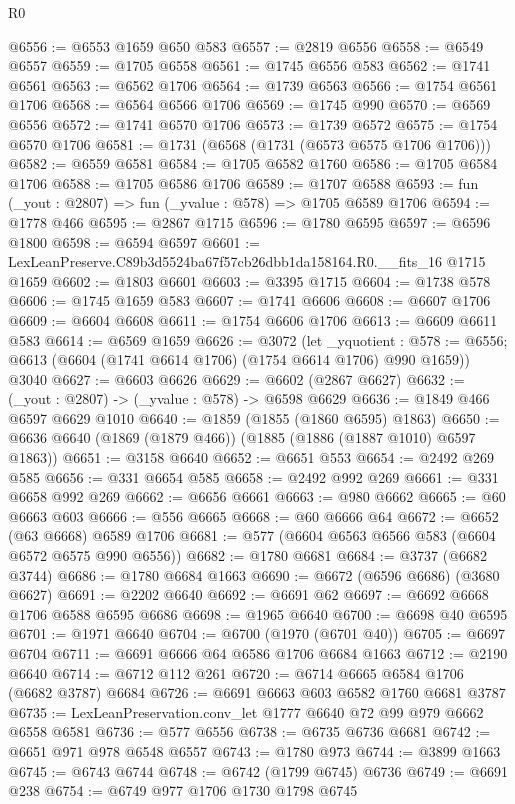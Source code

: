 \begin{lexlean}{R0}
\begin{coremodule}
@6556 := @6553 @1659 @650 @583
@6557 := @2819 @6556
@6558 := @6549 @6557
@6559 := @1705 @6558
@6561 := @1745 @6556 @583
@6562 := @1741 @6561
@6563 := @6562 @1706
@6564 := @1739 @6563
@6566 := @1754 @6561 @1706
@6568 := @6564 @6566 @1706
@6569 := @1745 @990
@6570 := @6569 @6556
@6572 := @1741 @6570 @1706
@6573 := @1739 @6572
@6575 := @1754 @6570 @1706
@6581 := @1731 (@6568 (@1731 (@6573 @6575 @1706 @1706)))
@6582 := @6559 @6581
@6584 := @1705 @6582 @1760
@6586 := @1705 @6584 @1706
@6588 := @1705 @6586 @1706
@6589 := @1707 @6588
@6593 := fun (_yout : @2807) => fun (_yvalue : @578) => @1705 @6589 @1706
@6594 := @1778 @466
@6595 := @2867 @1715
@6596 := @1780 @6595
@6597 := @6596 @1800
@6598 := @6594 @6597
@6601 := LexLeanPreserve.C89b3d5524ba67f57cb26dbb1da158164.R0.__fits_16 @1715 @1659
@6602 := @1803 @6601
@6603 := @3395 @1715
@6604 := @1738 @578
@6606 := @1745 @1659 @583
@6607 := @1741 @6606
@6608 := @6607 @1706
@6609 := @6604 @6608
@6611 := @1754 @6606 @1706
@6613 := @6609 @6611 @583
@6614 := @6569 @1659
@6626 := @3072
    (let _yquotient : @578 := @6556;
    @6613 (@6604 (@1741 @6614 @1706) (@1754 @6614 @1706) @990 @1659))
    @3040
@6627 := @6603 @6626
@6629 := @6602 (@2867 @6627)
@6632 := (_yout : @2807) -> (_yvalue : @578) -> @6598 @6629
@6636 := @1849 @466 @6597 @6629 @1010
@6640 := @1859 (@1855 (@1860 @6595) @1863)
@6650 := @6636 @6640 (@1869 (@1879 @466)) (@1885 (@1886 (@1887 @1010) @6597 @1863))
@6651 := @3158 @6640
@6652 := @6651 @553
@6654 := @2492 @269 @585
@6656 := @331 @6654 @585
@6658 := @2492 @992 @269
@6661 := @331 @6658 @992 @269
@6662 := @6656 @6661
@6663 := @980 @6662
@6665 := @60 @6663 @603
@6666 := @556 @6665
@6668 := @60 @6666 @64
@6672 := @6652 (@63 @6668) @6589 @1706
@6681 := @577 (@6604 @6563 @6566 @583 (@6604 @6572 @6575 @990 @6556))
@6682 := @1780 @6681
@6684 := @3737 (@6682 @3744)
@6686 := @1780 @6684 @1663
@6690 := @6672 (@6596 @6686) (@3680 @6627)
@6691 := @2202 @6640
@6692 := @6691 @62
@6697 := @6692 @6668 @1706 @6588 @6595 @6686
@6698 := @1965 @6640
@6700 := @6698 @40 @6595
@6701 := @1971 @6640
@6704 := @6700 (@1970 (@6701 @40))
@6705 := @6697 @6704
@6711 := @6691 @6666 @64 @6586 @1706 @6684 @1663
@6712 := @2190 @6640
@6714 := @6712 @112 @261
@6720 := @6714 @6665 @6584 @1706 (@6682 @3787) @6684
@6726 := @6691 @6663 @603 @6582 @1760 @6681 @3787
@6735 := LexLeanPreservation.conv_let @1777 @6640 @72 @99 @979 @6662 @6558 @6581
@6736 := @577 @6556
@6738 := @6735 @6736 @6681
@6742 := @6651 @971 @978 @6548 @6557
@6743 := @1780 @973
@6744 := @3899 @1663
@6745 := @6743 @6744
@6748 := @6742 (@1799 @6745) @6736
@6749 := @6691 @238
@6754 := @6749 @977 @1706 @1730 @1798 @6745

\end{coremodule}
\end{lexlean}
